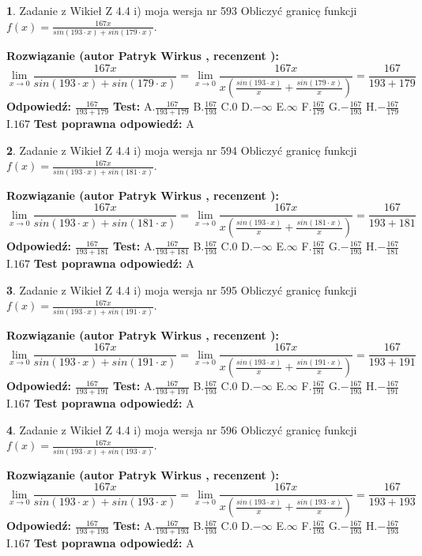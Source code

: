 \documentclass[12pt, a4paper]{article}
\theoremstyle{definition} %
\newtheorem{zad}{}
\newcommand{\zadStart}[1]{\begin{zad}#1\newline}
\newcommand{\zadStop}{\end{zad}}
\newcommand{\rozwStart}[2]{\noindent \textbf{Rozwiązanie (autor #1 , recenzent #2): }\newline}
\newcommand{\rozwStop}{\newline}
\newcommand{\odpStart}{\noindent \textbf{Odpowiedź:}\newline}
\newcommand{\odpStop}{\newline}
\newcommand{\testStart}{\noindent \textbf{Test:}\newline}
\newcommand{\testStop}{\newline}
\newcommand{\kluczStart}{\noindent \textbf{Test poprawna odpowiedź:}\newline}
\newcommand{\kluczStop}{\newline}
\begin{document}
\zadStart{Zadanie z Wikieł Z 4.4 i) moja wersja nr 593}
Obliczyć granicę funkcji $f(x)=\frac{167x}{sin(193\cdot x) +sin(179\cdot x)}$.
\zadStop
\rozwStart{Patryk Wirkus}{}
$$\lim\limits_{x\to 0}\frac{167x}{sin(193\cdot x) +sin(179\cdot x)}=\lim\limits_{x\to 0}\frac{167x}{x(\frac{sin(193\cdot x)}{x}+\frac{sin(179\cdot x)}{x})}=\frac{167}{193+179}$$
\rozwStop
\odpStart
$\frac{167}{193+179}$
\odpStop
\testStart
A.$\frac{167}{193+179}$
B.$\frac{167}{193}$
C.$0$
D.$-\infty$
E.$\infty$
F.$\frac{167}{179}$
G.$-\frac{167}{193}$
H.$-\frac{167}{179}$
I.$167$
\testStop
\kluczStart
A
\kluczStop



\zadStart{Zadanie z Wikieł Z 4.4 i) moja wersja nr 594}
Obliczyć granicę funkcji $f(x)=\frac{167x}{sin(193\cdot x) +sin(181\cdot x)}$.
\zadStop
\rozwStart{Patryk Wirkus}{}
$$\lim\limits_{x\to 0}\frac{167x}{sin(193\cdot x) +sin(181\cdot x)}=\lim\limits_{x\to 0}\frac{167x}{x(\frac{sin(193\cdot x)}{x}+\frac{sin(181\cdot x)}{x})}=\frac{167}{193+181}$$
\rozwStop
\odpStart
$\frac{167}{193+181}$
\odpStop
\testStart
A.$\frac{167}{193+181}$
B.$\frac{167}{193}$
C.$0$
D.$-\infty$
E.$\infty$
F.$\frac{167}{181}$
G.$-\frac{167}{193}$
H.$-\frac{167}{181}$
I.$167$
\testStop
\kluczStart
A
\kluczStop



\zadStart{Zadanie z Wikieł Z 4.4 i) moja wersja nr 595}
Obliczyć granicę funkcji $f(x)=\frac{167x}{sin(193\cdot x) +sin(191\cdot x)}$.
\zadStop
\rozwStart{Patryk Wirkus}{}
$$\lim\limits_{x\to 0}\frac{167x}{sin(193\cdot x) +sin(191\cdot x)}=\lim\limits_{x\to 0}\frac{167x}{x(\frac{sin(193\cdot x)}{x}+\frac{sin(191\cdot x)}{x})}=\frac{167}{193+191}$$
\rozwStop
\odpStart
$\frac{167}{193+191}$
\odpStop
\testStart
A.$\frac{167}{193+191}$
B.$\frac{167}{193}$
C.$0$
D.$-\infty$
E.$\infty$
F.$\frac{167}{191}$
G.$-\frac{167}{193}$
H.$-\frac{167}{191}$
I.$167$
\testStop
\kluczStart
A
\kluczStop



\zadStart{Zadanie z Wikieł Z 4.4 i) moja wersja nr 596}
Obliczyć granicę funkcji $f(x)=\frac{167x}{sin(193\cdot x) +sin(193\cdot x)}$.
\zadStop
\rozwStart{Patryk Wirkus}{}
$$\lim\limits_{x\to 0}\frac{167x}{sin(193\cdot x) +sin(193\cdot x)}=\lim\limits_{x\to 0}\frac{167x}{x(\frac{sin(193\cdot x)}{x}+\frac{sin(193\cdot x)}{x})}=\frac{167}{193+193}$$
\rozwStop
\odpStart
$\frac{167}{193+193}$
\odpStop
\testStart
A.$\frac{167}{193+193}$
B.$\frac{167}{193}$
C.$0$
D.$-\infty$
E.$\infty$
F.$\frac{167}{193}$
G.$-\frac{167}{193}$
H.$-\frac{167}{193}$
I.$167$
\testStop
\kluczStart
A
\kluczStop
\end{document}
